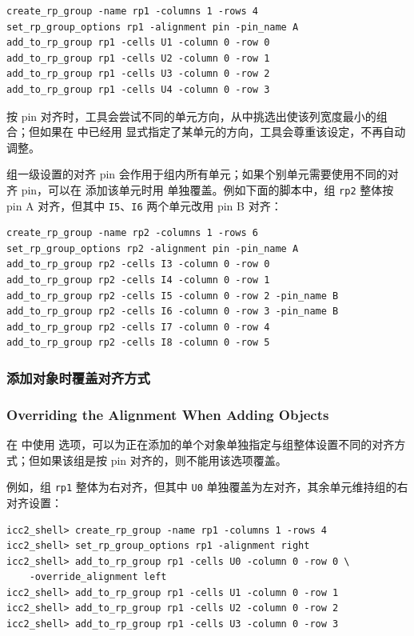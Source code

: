 \begin{lstlisting}
create_rp_group -name rp1 -columns 1 -rows 4
set_rp_group_options rp1 -alignment pin -pin_name A
add_to_rp_group rp1 -cells U1 -column 0 -row 0
add_to_rp_group rp1 -cells U2 -column 0 -row 1
add_to_rp_group rp1 -cells U3 -column 0 -row 2
add_to_rp_group rp1 -cells U4 -column 0 -row 3
\end{lstlisting}

按 pin 对齐时，工具会尝试不同的单元方向，从中挑选出使该列宽度最小的组合；但如果在  中已经用  显式指定了某单元的方向，工具会尊重该设定，不再自动调整。

组一级设置的对齐 pin 会作用于组内所有单元；如果个别单元需要使用不同的对齐 pin，可以在  添加该单元时用  单独覆盖。例如下面的脚本中，组 \texttt{rp2} 整体按 pin A 对齐，但其中 \texttt{I5}、\texttt{I6} 两个单元改用 pin B 对齐：
\begin{lstlisting}
create_rp_group -name rp2 -columns 1 -rows 6
set_rp_group_options rp2 -alignment pin -pin_name A
add_to_rp_group rp2 -cells I3 -column 0 -row 0
add_to_rp_group rp2 -cells I4 -column 0 -row 1
add_to_rp_group rp2 -cells I5 -column 0 -row 2 -pin_name B
add_to_rp_group rp2 -cells I6 -column 0 -row 3 -pin_name B
add_to_rp_group rp2 -cells I7 -column 0 -row 4
add_to_rp_group rp2 -cells I8 -column 0 -row 5
\end{lstlisting}

\subsubsection{添加对象时覆盖对齐方式}
\subsubsection*{Overriding the Alignment When Adding Objects}

在  中使用  选项，可以为正在添加的单个对象单独指定与组整体设置不同的对齐方式；但如果该组是按 pin 对齐的，则不能用该选项覆盖。

例如，组 \texttt{rp1} 整体为右对齐，但其中 \texttt{U0} 单独覆盖为左对齐，其余单元维持组的右对齐设置：
\begin{lstlisting}
icc2_shell> create_rp_group -name rp1 -columns 1 -rows 4
icc2_shell> set_rp_group_options rp1 -alignment right
icc2_shell> add_to_rp_group rp1 -cells U0 -column 0 -row 0 \
    -override_alignment left
icc2_shell> add_to_rp_group rp1 -cells U1 -column 0 -row 1
icc2_shell> add_to_rp_group rp1 -cells U2 -column 0 -row 2
icc2_shell> add_to_rp_group rp1 -cells U3 -column 0 -row 3
\end{lstlisting}

